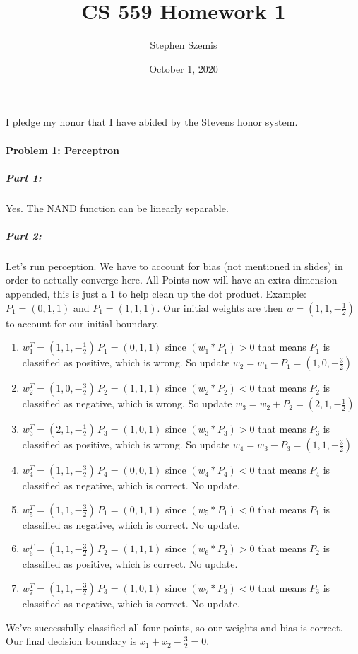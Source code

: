 \documentclass[12pt]{article}
\begin{document}
    \title{CS 559 Homework 1}
    \author{Stephen Szemis}
    \date{October 1, 2020}
    \maketitle

    I pledge my honor that I have abided by the Stevens honor system.

    \paragraph{Problem 1: Perceptron}
    \subparagraph{Part 1:}
    Yes. The NAND function can be linearly separable.
    \subparagraph{Part 2:}
    Let's run perception. We have to account for bias (not mentioned in slides) in
    order to actually converge here. All Points now will have an extra dimension 
    appended, this is just a 1 to help clean up the dot product. Example:
    \(P_1=(0, 1, 1)\) and \(P_1=(1, 1, 1)\). Our initial weights are then
    \(w=(1, 1, -\frac{1}{2})\) to account for our initial boundary.
    \begin{enumerate}
        \item 
        \(w_1^T=(1, 1, -\frac{1}{2}) \, P_1=(0, 1, 1) \) since 
        \((w_1 * P_1) > 0 \) that means
        \(P_1\) is classified as positive, which is wrong.
        So update \(w_2 = w_1 - P_1 = (1, 0, -\frac{3}{2})\)
        \item 
        \(w_2^T=(1, 0, -\frac{3}{2}) \, P_2=(1, 1, 1) \) since 
        \((w_2 * P_2) < 0 \) that means
        \(P_2\) is classified as negative, which is wrong.
        So update \(w_3 = w_2 + P_2 = (2, 1, -\frac{1}{2})\)
        \item 
        \(w_3^T=(2, 1, -\frac{1}{2}) \, P_3=(1, 0, 1) \) since 
        \((w_3 * P_3) > 0 \) that means
        \(P_3\) is classified as positive, which is wrong.
        So update \(w_4 = w_3 - P_3 = (1, 1, -\frac{3}{2})\)
        \item 
        \(w_4^T=(1, 1, -\frac{3}{2}) \, P_4=(0, 0, 1) \) since 
        \((w_4 * P_4) < 0 \) that means
        \(P_4\) is classified as negative, which is correct. No update.
        \item 
        \(w_5^T=(1, 1, -\frac{3}{2}) \, P_1=(0, 1, 1) \) since 
        \((w_5 * P_1) < 0 \) that means
        \(P_1\) is classified as negative, which is correct. No update.
        \item 
        \(w_6^T=(1, 1, -\frac{3}{2}) \, P_2=(1, 1, 1) \) since 
        \((w_6 * P_2) > 0 \) that means
        \(P_2\) is classified as positive, which is correct. No update.
        \item 
        \(w_7^T=(1, 1, -\frac{3}{2}) \, P_3=(1, 0, 1) \) since 
        \((w_7 * P_3) < 0 \) that means
        \(P_3\) is classified as negative, which is correct. No update.
    \end{enumerate}
    We've successfully classified all four points, so our weights and bias is
    correct. Our final decision boundary is \( x_1 + x_2 - \frac{3}{2} = 0 \).
\end{document}
